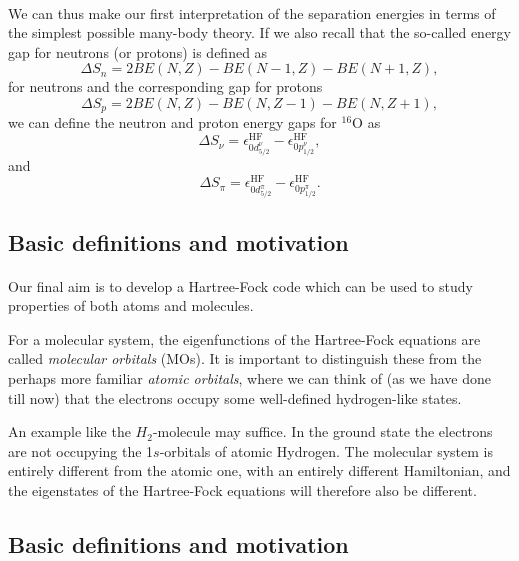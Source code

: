 \documentclass[%
twoside,                 %
final,                   %
10pt]{article}
\begin{document}
\paragraph{}
We can thus make our first interpretation of the separation energies in terms of the simplest
possible many-body theory. 
If we also recall that the so-called energy gap for neutrons (or protons) is defined as
\[
\Delta S_n= 2BE(N,Z)-BE(N-1,Z)-BE(N+1,Z),
\]
for neutrons and the corresponding gap for protons
\[
\Delta S_p= 2BE(N,Z)-BE(N,Z-1)-BE(N,Z+1),
\]
we can define the neutron and proton energy gaps for ${}^{16}\mbox{O}$ as
\[
\Delta S_{\nu}=\epsilon_{0d^{\nu}_{5/2}}^{\mathrm{HF}}-\epsilon_{0p^{\nu}_{1/2}}^{\mathrm{HF}}, 
\]
and 
\[
\Delta S_{\pi}=\epsilon_{0d^{\pi}_{5/2}}^{\mathrm{HF}}-\epsilon_{0p^{\pi}_{1/2}}^{\mathrm{HF}}. 
\]





\subsection*{Basic definitions and motivation}

\paragraph{}

Our final aim is to develop a Hartree-Fock code which can be used to study properties of
both atoms and molecules.

For a molecular system, the eigenfunctions of the Hartree-Fock equations are called
\emph{molecular orbitals} (MOs). It is important to distinguish these
from the perhaps more familiar \emph{atomic orbitals}, where we can think of (as we have done till now)
that the electrons occupy some well-defined hydrogen-like states.

An example like the $H_2$-molecule may suffice.
In the ground state the electrons are not occupying the 1$s$-orbitals of atomic Hydrogen. The
molecular system is entirely different from the atomic one, with an entirely different Hamiltonian,
and the eigenstates of the Hartree-Fock equations will therefore also be different.







\subsection*{Basic definitions and motivation}
\end{document}
